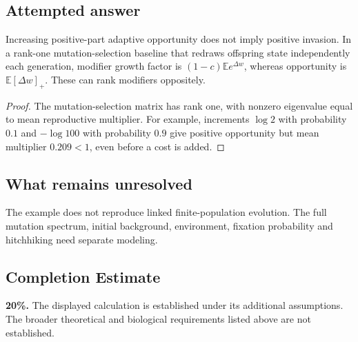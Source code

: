 \documentclass[11pt]{article}
\begin{document}
\subsection{Attempted answer}
\begin{proposition}
Increasing positive-part adaptive opportunity does not imply positive invasion. In a rank-one mutation-selection baseline that redraws offspring state independently each generation, modifier growth factor is $(1-c)\mathbb{E} e^{\Delta w}$, whereas opportunity is $\mathbb{E}[\Delta w]_+$. These can rank modifiers oppositely.
\end{proposition}
\begin{proof}
The mutation-selection matrix has rank one, with nonzero eigenvalue equal to mean reproductive multiplier. For example, increments $\log2$ with probability $0.1$ and $-\log100$ with probability $0.9$ give positive opportunity but mean multiplier $0.209<1$, even before a cost is added.
\end{proof}
\subsection{What remains unresolved}
The example does not reproduce linked finite-population evolution. The full mutation spectrum, initial background, environment, fixation probability and hitchhiking need separate modeling.
\subsection{Completion Estimate}
\textbf{20\%.} The displayed calculation is established under its additional assumptions. The broader theoretical and biological requirements listed above are not established.
\end{document}
